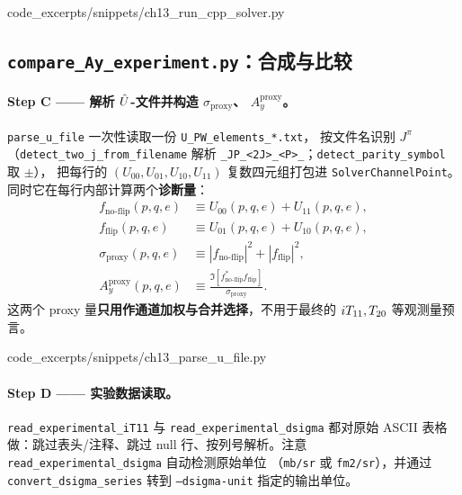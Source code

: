 
  {code_excerpts/snippets/ch13_run_cpp_solver.py}

\subsection{\texttt{compare\_Ay\_experiment.py}：合成与比较}
\label{subsec:ch13-code-compare}

\paragraph{Step C —— 解析 \(\hat{U}\)-文件并构造 \(\sigma_{\text{proxy}}\)、
\(A_y^{\text{proxy}}\)。}
\texttt{parse\_u\_file} 一次性读取一份 \texttt{U\_PW\_elements\_*.txt}，
按文件名识别 \(J^\pi\)（\texttt{detect\_two\_j\_from\_filename} 解析
\verb|_JP_<2J>_<P>_|；\texttt{detect\_parity\_symbol} 取 \(\pm\)），
把每行的 \((U_{00}, U_{01}, U_{10}, U_{11})\) 复数四元组打包进
\texttt{SolverChannelPoint}。同时它在每行内部计算两个\textbf{诊断量}：
\begin{align}
\label{eq:ch13-fnoflip-fflip}
f_{\text{no-flip}}(p, q, e) &\equiv U_{00}(p, q, e) + U_{11}(p, q, e),\\
f_{\text{flip}}(p, q, e)    &\equiv U_{01}(p, q, e) + U_{10}(p, q, e),\\
\sigma_{\text{proxy}}(p, q, e) &\equiv |f_{\text{no-flip}}|^2 + |f_{\text{flip}}|^2,\\
A_y^{\text{proxy}}(p, q, e) &\equiv
\frac{\Im\![f_{\text{no-flip}}^{*} f_{\text{flip}}]}{\sigma_{\text{proxy}}}.
\end{align}
这两个 proxy 量\textbf{只用作通道加权与合并选择}，不用于最终的
\({i T_{11}}, {T_{20}}\) 等观测量预言。


  {code_excerpts/snippets/ch13_parse_u_file.py}

\paragraph{Step D —— 实验数据读取。}
\texttt{read\_experimental\_iT11} 与 \texttt{read\_experimental\_dsigma}
都对原始 ASCII 表格做：跳过表头/注释、跳过 null 行、按列号解析。注意
\texttt{read\_experimental\_dsigma} 自动检测原始单位
（\texttt{mb/sr} 或 \texttt{fm2/sr}），并通过
\texttt{convert\_dsigma\_series} 转到 \texttt{--dsigma-unit} 指定的输出单位。

